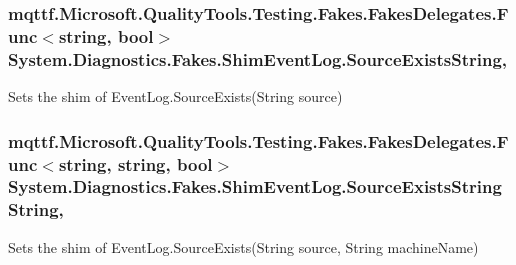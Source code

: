 \hypertarget{class_system_1_1_diagnostics_1_1_fakes_1_1_shim_event_log_ade021a4084883ada6e6bbeffddb3ee7a}{
\subsubsection[{Source\-Exists\-String}]{\setlength{\rightskip}{0pt plus 5cm}mqttf.\-Microsoft.\-Quality\-Tools.\-Testing.\-Fakes.\-Fakes\-Delegates.\-Func$<$string, bool$>$ System.\-Diagnostics.\-Fakes.\-Shim\-Event\-Log.\-Source\-Exists\-String\hspace{0.3cm}{\ttfamily [static]}, {\ttfamily [set]}}}\label{class_system_1_1_diagnostics_1_1_fakes_1_1_shim_event_log_ade021a4084883ada6e6bbeffddb3ee7a}


Sets the shim of Event\-Log.\-Source\-Exists(\-String source)

\hypertarget{class_system_1_1_diagnostics_1_1_fakes_1_1_shim_event_log_addd8a9e693b349313ddcf8e2e3bfca42}{
\subsubsection[{Source\-Exists\-String\-String}]{\setlength{\rightskip}{0pt plus 5cm}mqttf.\-Microsoft.\-Quality\-Tools.\-Testing.\-Fakes.\-Fakes\-Delegates.\-Func$<$string, string, bool$>$ System.\-Diagnostics.\-Fakes.\-Shim\-Event\-Log.\-Source\-Exists\-String\-String\hspace{0.3cm}{\ttfamily [static]}, {\ttfamily [set]}}}\label{class_system_1_1_diagnostics_1_1_fakes_1_1_shim_event_log_addd8a9e693b349313ddcf8e2e3bfca42}


Sets the shim of Event\-Log.\-Source\-Exists(\-String source, String machine\-Name)

